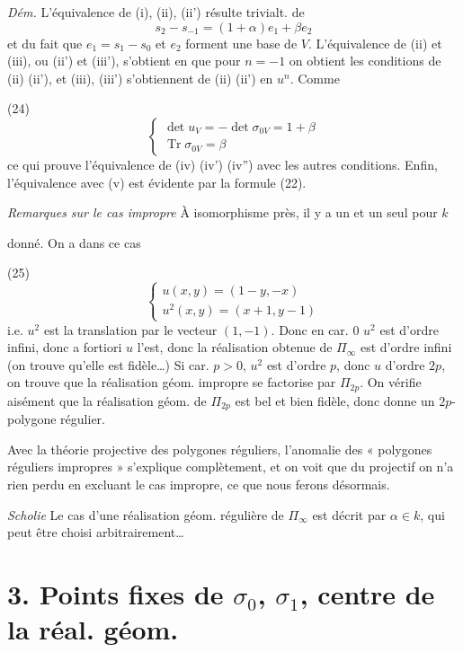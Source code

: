 \documentclass[11pt,a4paper]{article}
\begin{document}
\emph{Dém.} L'équivalence de (i), (ii), (ii') résulte trivialt. de
\[
s_2 - s_{-1} = (1+\alpha) e_1 + \beta e_2
\]
et du fait que $e_1 = s_1 - s_0$ et $e_2$ forment une base de $V$. L'équivalence de (ii) et (iii), ou (ii') et (iii'), s'obtient en  \ill{} que pour $n = -1$ on obtient les conditions de (ii) (ii'), et  (iii), (iii') s'obtiennent de (ii) (ii') en  $u^n$. Comme

(24)
\[
\begin{cases}
\det u_V = -\det \sigma_{0V} = 1 + \beta \\
\operatorname{Tr} \sigma_{0V} = \beta
\end{cases}
\]
ce qui prouve l'équivalence de (iv) (iv') (iv'') avec les autres conditions. Enfin, l'équivalence avec (v) est évidente par la  formule (22).

\emph{Remarques sur le cas impropre} À isomorphisme près, il y a un et un seul pour \ill{} $k$

donné. On a dans ce cas

(25)
\[
\begin{cases}
u(x,y) = (1-y, -x) \\
u^2(x,y) = (x+1, y-1)
\end{cases}
\]
i.e. $u^2$ est la translation par le vecteur $(1,-1)$. Donc en car. 0 $u^2$ est d'ordre infini, donc a fortiori $u$ l'est, donc la réalisation obtenue de $\Pi_\infty$ est d'ordre infini (on trouve qu'elle est fidèle…) Si car. $p > 0$, $u^2$ est d'ordre $p$, donc $u$ d'ordre $2p$, on trouve   que la réalisation géom. impropre se factorise par $\Pi_{2p}$. On vérifie aisément que la réalisation géom. de $\Pi_{2p}$ est bel et bien fidèle, donc donne un $2p$-polygone régulier.

Avec la théorie projective des polygones réguliers, l'anomalie  des « polygones réguliers impropres » s'explique complètement, et on voit que du  projectif on n'a rien perdu en excluant le cas impropre, ce que nous ferons désormais.

\emph{Scholie} Le cas d'une réalisation géom. régulière  de $\Pi_\infty$ est décrit par $\alpha \in k$, qui peut être choisi arbitrairement…


\section*{3. Points fixes de $\sigma_0$, $\sigma_1$, centre de la réal. géom.}
\end{document}
